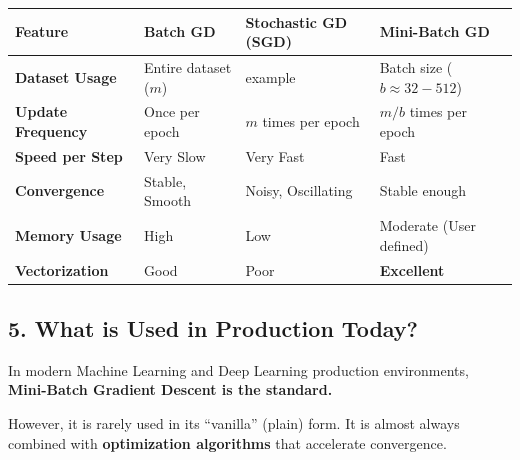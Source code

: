 \documentclass[
  italian,
  11pt,
]{article}
\newcounter{none} %
\begin{document}
{\def\LTcaptype{none} %
\begin{longtable}[]{@{}
  >{\raggedright\arraybackslash}p{}
  >{\raggedright\arraybackslash}p{}
  >{\raggedright\arraybackslash}p{}
  >{\raggedright\arraybackslash}p{}@{}}
\toprule\noalign{}
\begin{minipage}[b]{\linewidth}\raggedright
\textbf{Feature}
\end{minipage} & \begin{minipage}[b]{\linewidth}\raggedright
\textbf{Batch GD}
\end{minipage} & \begin{minipage}[b]{\linewidth}\raggedright
\textbf{Stochastic GD (SGD)}
\end{minipage} & \begin{minipage}[b]{\linewidth}\raggedright
\textbf{Mini-Batch GD}
\end{minipage} \\
\midrule\noalign{}
\endhead
\bottomrule\noalign{}
\endlastfoot
\textbf{Dataset Usage} & Entire dataset (\(m\)) & 1 example & Batch size
(\(b \approx 32-512\)) \\
\textbf{Update Frequency} & Once per epoch & \(m\) times per epoch &
\(m/b\) times per epoch \\
\textbf{Speed per Step} & Very Slow & Very Fast & Fast \\
\textbf{Convergence} & Stable, Smooth & Noisy, Oscillating & Stable
enough \\
\textbf{Memory Usage} & High & Low & Moderate (User defined) \\
\textbf{Vectorization} & Good & Poor & \textbf{Excellent} \\
\end{longtable}
}

\subsection{5. What is Used in Production
Today?}\label{what-is-used-in-production-today}

In modern Machine Learning and Deep Learning production environments,
\textbf{Mini-Batch Gradient Descent is the standard.}

However, it is rarely used in its ``vanilla'' (plain) form. It is almost
always combined with \textbf{optimization algorithms} that accelerate
convergence.
\end{document}
